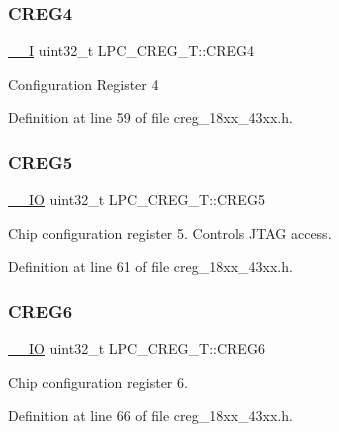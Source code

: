 \subsubsection{\texorpdfstring{C\+R\+E\+G4}{CREG4}}
{\footnotesize\ttfamily \hyperlink{core__sc300_8h_af63697ed9952cc71e1225efe205f6cd3}{\+\_\+\+\_\+I} uint32\+\_\+t L\+P\+C\+\_\+\+C\+R\+E\+G\+\_\+\+T\+::\+C\+R\+E\+G4}

Configuration Register 4 

Definition at line 59 of file creg\+\_\+18xx\+\_\+43xx.\+h.

\mbox{\label{struct_l_p_c___c_r_e_g___t_a92d6cfc2c0341236a279be5eb858e6ac}} 
\subsubsection{\texorpdfstring{C\+R\+E\+G5}{CREG5}}
{\footnotesize\ttfamily \hyperlink{core__sc300_8h_aec43007d9998a0a0e01faede4133d6be}{\+\_\+\+\_\+\+IO} uint32\+\_\+t L\+P\+C\+\_\+\+C\+R\+E\+G\+\_\+\+T\+::\+C\+R\+E\+G5}

Chip configuration register 5. Controls J\+T\+AG access. 

Definition at line 61 of file creg\+\_\+18xx\+\_\+43xx.\+h.

\mbox{\label{struct_l_p_c___c_r_e_g___t_af257de99c627d4b3413ed780f9d79d70}} 
\subsubsection{\texorpdfstring{C\+R\+E\+G6}{CREG6}}
{\footnotesize\ttfamily \hyperlink{core__sc300_8h_aec43007d9998a0a0e01faede4133d6be}{\+\_\+\+\_\+\+IO} uint32\+\_\+t L\+P\+C\+\_\+\+C\+R\+E\+G\+\_\+\+T\+::\+C\+R\+E\+G6}

Chip configuration register 6. 

Definition at line 66 of file creg\+\_\+18xx\+\_\+43xx.\+h.

\mbox{\label{struct_l_p_c___c_r_e_g___t_ab0b666d4bace7bb868a417d7b48f3215}} 
